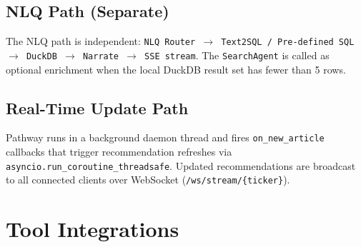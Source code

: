 \documentclass[11pt, a4paper]{article}
\begin{document}
\subsection{NLQ Path (Separate)}

The NLQ path is independent: \texttt{NLQ Router $\to$ Text2SQL / Pre-defined SQL $\to$
DuckDB $\to$ Narrate $\to$ SSE stream}. The \texttt{SearchAgent} is called as optional
enrichment when the local DuckDB result set has fewer than 5 rows.

\subsection{Real-Time Update Path}

Pathway runs in a background daemon thread and fires \texttt{on\_new\_article} callbacks
that trigger recommendation refreshes via \texttt{asyncio.run\_coroutine\_threadsafe}.
Updated recommendations are broadcast to all connected clients over WebSocket
(\texttt{/ws/stream/\{ticker\}}).

\section{Tool Integrations}
\end{document}
